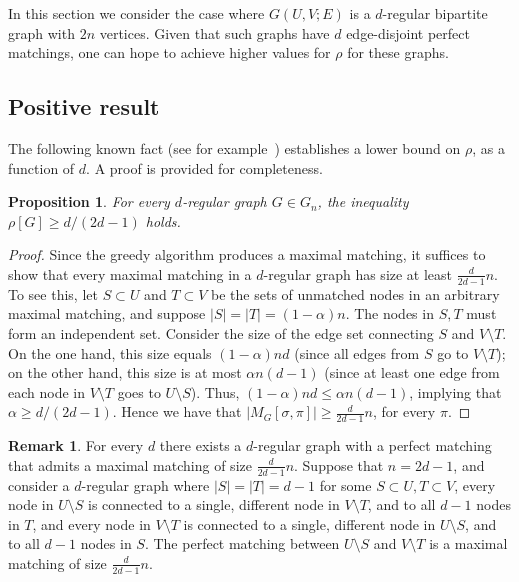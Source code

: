 \documentclass[11pt]{article}
\numberwithin{equation}{section}
\newtheorem{proposition}[theorem]{Proposition}
\theoremstyle{definition}
\newtheorem{remark}[theorem]{Remark}
\theoremstyle{plain}
\theoremstyle{plain}
\begin{document}
In this section we consider the case where $G(U,V;E)$ is a $d$-regular bipartite graph with $2n$ vertices. Given that such graphs have $d$
%
edge-disjoint  %
perfect matchings, one can hope to achieve higher values for $\rho$ for these graphs.

\subsection{Positive result}
\label{sec:regular-pos}

The following known %
%
fact %
(see for example~\cite{NaorW15}) establishes a lower bound on $\rho$, as a function of $d$.
A proof is provided for completeness.

\begin{proposition}
	\label{pro:smalld}
For every $d$-regular graph $G \in G_n$, 
%
the inequality  $\rho[G] \ge  d/(2d-1)$ holds.  %
\end{proposition}

\begin{proof}
	Since the greedy algorithm produces a maximal matching, it suffices to show that every maximal matching in a $d$-regular graph has size at least $\frac{d}{2d-1}n$.
	To see this, let $S \subset U$ and $T \subset V$ be the sets of unmatched nodes in an arbitrary maximal matching, and suppose $|S|=|T|=(1-\alpha) n$. The nodes in $S,T$ must form an independent set.
	Consider the size of the edge set connecting $S$ and $V \setminus T$.
	On the one hand, this size equals $(1-\alpha) n d$ (since all edges from $S$ go to $V \setminus T$); on the other hand, this size is at most $\alpha n (d-1)$ (since at least one edge from each node in $V \setminus T$ goes to $U \setminus S$).
	Thus, $(1-\alpha) n d \leq \alpha n (d-1)$, implying that $\alpha \geq d/(2d-1)$.
	Hence we have that $|M_G[\sigma,\pi]| \ge  \frac{d}{2d-1}n$, for every $\pi$.
\end{proof}

\begin{remark}
	For every $d$ there exists a $d$-regular graph with a perfect matching that admits a maximal matching of size $\frac{d}{2d-1}n$. Suppose that $n = 2d-1$, and
consider a $d$-regular graph where $|S|=|T|=d-1$ for some $S \subset U, T \subset V$, every node in $U \setminus S$ is connected to a single, different node in $V \setminus T$, and to all $d-1$ nodes in $T$, and every node in $V \setminus T$ is connected to a single, different node in $U \setminus S$, and to all $d-1$ nodes in $S$. The perfect matching between $U \setminus S$ and $V \setminus T$ is a maximal matching of size $\frac{d}{2d-1}n$.
\end{remark}
\end{document}
